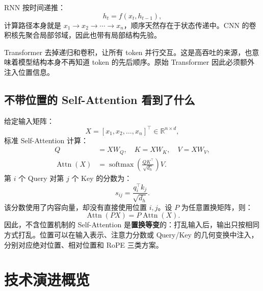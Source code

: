 \documentclass[UTF8,fontset=none,a4paper,10pt]{ctexart}
\newcommand{\term}[1]{\textbf{#1}}
\newcommand{\R}{\mathbb{R}}
\newcommand{\softmax}{\operatorname{softmax}}
\newcommand{\Attn}{\operatorname{Attn}}
\begin{document}
RNN 按时间递推：
\begin{equation}
  h_t=f(x_t,h_{t-1}),
  \label{eq:rnn}
\end{equation}
计算路径本身就是 $x_1\rightarrow x_2\rightarrow\cdots\rightarrow x_n$，顺序天然存在于状态传递中。CNN 的卷积核先聚合局部邻域，因此也带有局部结构先验。

Transformer 去掉递归和卷积，让所有 token 并行交互。这是高吞吐的来源，也意味着模型结构本身不再知道 token 的先后顺序。原始 Transformer 因此必须额外注入位置信息\cite{vaswani2017}。

\subsection{不带位置的 Self-Attention 看到了什么}

给定输入矩阵：
\begin{equation}
  X=[x_1,x_2,\ldots,x_n]^\top\in\R^{n\times d},
  \label{eq:input}
\end{equation}
标准 Self-Attention 计算：
\begin{align}
  Q&=XW_Q,\quad K=XW_K,\quad V=XW_V, \label{eq:qkv}\\
  \Attn(X)&=\softmax\!\left(\frac{QK^\top}{\sqrt{d_h}}\right)V. \label{eq:attention}
\end{align}
第 $i$ 个 Query 对第 $j$ 个 Key 的分数为：
\begin{equation}
  s_{ij}=\frac{q_i^\top k_j}{\sqrt{d_h}}.
  \label{eq:score}
\end{equation}
该分数使用了内容向量，却没有直接使用位置 $i,j$。设 $P$ 为任意置换矩阵，则：
\begin{equation}
  \Attn(PX)=P\Attn(X).
  \label{eq:permutation}
\end{equation}
因此，不含位置机制的 Self-Attention 是\term{置换等变}的：打乱输入后，输出只按相同方式打乱。位置可以在输入表示、注意力分数或 Query/Key 的几何变换中注入，分别对应绝对位置、相对位置和 RoPE 三类方案。

\section{技术演进概览}
\end{document}

